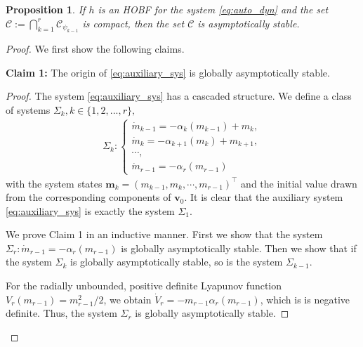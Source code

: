 \documentclass[letterpaper, 10 pt, journal, twoside]{IEEEtran}
\theoremstyle{plain}
\newtheorem{proposition}{Proposition}
\newcommand{\myvar}[1]{\bm{#1}}
\newcommand{\myset}[1]{\mathscr{#1}}
\begin{document}
  \begin{proposition} \label{prop:AS_hobf}
    If $h$ is an HOBF for the system \eqref{eq:auto_dyn}  and the set $\myset{C}:=\bigcap_{k = 1}^{r} \myset{C}_{\psi_{k-1}}$ is compact, then the set  $\myset{C}$ is asymptotically stable.
  \end{proposition} 
  \begin{proof}
 We first show the following claims.
  
 \noindent \textbf{Claim 1:}  The origin of \eqref{eq:auxiliary_sys} is globally asymptotically stable.
  

  \begin{proof}
The system \eqref{eq:auxiliary_sys} has a cascaded structure.  {We} define a class of systems $ \Sigma_k, k \in \{1,2,...,r\} ,$
\begin{align*}
    \Sigma_k : \left\{ \begin{array}{l}
        \dot{m}_{k-1} = -\alpha_k(m_{k-1}) + m_{k}, \\
        \dot{m}_{k} = -\alpha_{k+1}(m_{k}) + m_{k+1}, \\
        \cdots,\\
        \dot{m}_{r-1} = -\alpha_{r}(m_{r-1}) 
    \end{array}\right.
\end{align*}
 with the system states $\myvar{m}_k = (m_{k-1}, m_{k}, \cdots, m_{r-1})^\top$ and the initial value drawn from the corresponding components of $\myvar{v}_0$. It is clear that the auxiliary system \eqref{eq:auxiliary_sys} is exactly the system $\Sigma_{1}$.

We prove Claim 1 in an inductive manner. {F}irst we show that {the} system $\Sigma_{r}: \dot{m}_{r-1} = -\alpha_{r}(m_{r-1}) $ is globally asymptotically stable. {T}hen we show that if {the} system $\Sigma_{k}$ is globally asymptotically stable, so is {the} system $\Sigma_{k-1}$.

{For the} radially unbounded, positive definite Lyapunov function $V_{r}(m_{r-1}) = m_{r-1}^2/2$, we obtain $\dot{V}_{r} = - m_{r-1}\alpha_r(m_{r-1})${, which is} is negative definite. Thus, {the} system $\Sigma_{r}$ is globally asymptotically stable.


\end{proof}
\end{proof}
\end{document}
